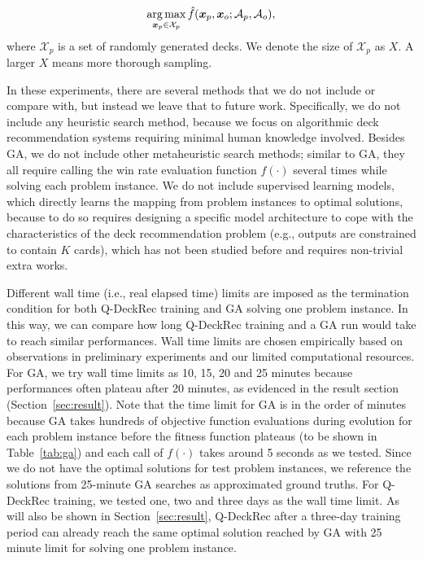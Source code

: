 \begin{align}
\operatorname*{arg\,max}_{\boldsymbol{x}_p \in \mathcal{X}_p} \hat{f}(\boldsymbol{x}_p, \boldsymbol{x}_o; \mathcal{A}_p, \mathcal{A}_o),
\label{eqn:mcmaxobj}
\end{align}
where $\mathcal{X}_p$ is a set of randomly generated decks. We denote the size of $\mathcal{X}_p$ as $X$. A larger $X$ means more thorough sampling.

In these experiments, there are several methods that we do not include or compare with, but instead we leave that to future work. Specifically, we do not include any  heuristic search method, because we focus on algorithmic deck recommendation systems requiring minimal human knowledge involved. Besides GA, we do not include other metaheuristic search methods; similar to GA, they all require calling the win rate evaluation function $f(\cdot)$ several times while solving each problem instance. We do not include supervised learning models, which directly learns the mapping from problem instances to optimal solutions, because to do so requires designing a specific model architecture to cope with the characteristics of the deck recommendation problem (e.g., outputs are constrained to contain $K$ cards), which has not been studied before and requires non-trivial extra works.

Different wall time (i.e., real elapsed time) limits are imposed as the termination condition for both Q-DeckRec training and GA solving one problem instance. In this way, we can compare how long Q-DeckRec training and a GA run would take to reach similar performances. Wall time limits are chosen empirically based on observations in preliminary experiments and our limited computational resources. For GA, we try wall time limits as 10, 15, 20 and 25 minutes because performances often plateau after 20 minutes, as evidenced in the result section (Section~\ref{sec:result}). Note that the time limit for GA is in the order of minutes because GA takes hundreds of objective function evaluations during evolution for each problem instance before the fitness function plateaus (to be shown in Table~\ref{tab:ga}) and each call of $f(\cdot)$ takes around 5 seconds as we tested. Since we do not have the optimal solutions for test problem instances, we reference the solutions from 25-minute GA searches as approximated ground truths. For Q-DeckRec training, we tested one, two and three days as the wall time limit. As will also be shown in Section~\ref{sec:result}, Q-DeckRec after a three-day training period can already reach the same optimal solution reached by GA with 25 minute limit for solving one problem instance.

